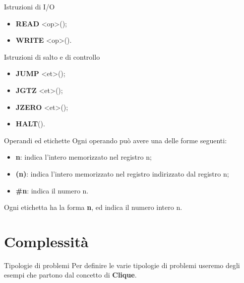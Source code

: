 \documentclass[10pt,a4paper]{article}
\begin{document}
\begin{multicols}{3}
\begin{textbox}{Istruzioni di I/O}
\begin{itemize}[leftmargin=*]
    \item \textbf{READ} <op>\quad();
    \item \textbf{WRITE} <op>\quad().
\end{itemize}
\end{textbox}

\begin{textbox}{Istruzioni di salto e di controllo}
\begin{itemize}[leftmargin=*]
    \item \textbf{JUMP} <et>\quad();
    \item \textbf{JGTZ} <et>\quad();
    \item \textbf{JZERO} <et>\quad();
    \item \textbf{HALT}\quad().
\end{itemize}
\end{textbox}

\begin{textbox}{Operandi ed etichette}
Ogni operando  può avere una delle forme seguenti:
\begin{itemize}[leftmargin=*]
    \item \textbf{n}:  indica l’intero memorizzato nel registro n;
    \item \textbf{(n)}:  indica l’intero memorizzato nel registro indirizzato dal
    registro n;
    \item \textbf{\#n}:  indica il numero n.
\end{itemize}
Ogni etichetta  ha la forma \textbf{n}, ed indica il numero intero n.
\end{textbox}

\section{Complessità}

\begin{textbox}{Tipologie di problemi}
Per definire le varie tipologie di problemi useremo degli esempi che
partono dal concetto di \textbf{Clique}.\\


\end{textbox}
\end{multicols}
\end{document}
